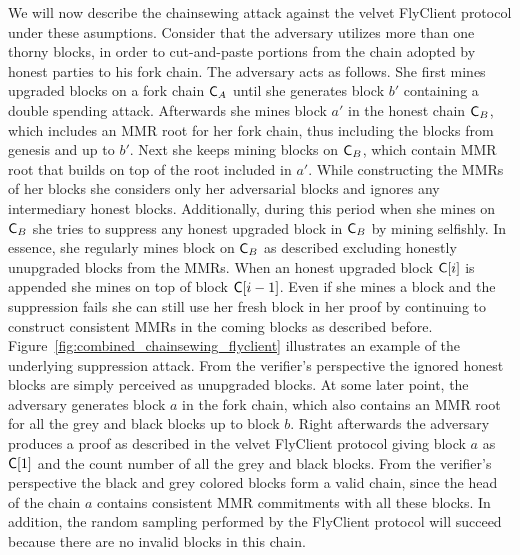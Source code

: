 	We will now describe the chainsewing attack against the velvet FlyClient protocol under these asumptions.
	Consider that the adversary utilizes more than one thorny blocks, in order to cut-and-paste portions from the chain adopted by honest parties to his fork chain. 
    The adversary acts as follows. 
    She first mines upgraded blocks on a fork chain $\mathsf{C}_A$ until she generates block $b'$ containing a double spending attack. 
    Afterwards she mines block $a'$ in the honest chain $\mathsf{C}_B$, which includes an MMR root for her fork chain, thus including the blocks from genesis and up to $b'$. 
    Next she keeps mining blocks on $\mathsf{C}_B$, which contain MMR root that builds on top of the root included in $a'$. While constructing the MMRs of her blocks she considers only her 
    adversarial blocks and ignores any intermediary honest blocks. 
    Additionally, during this period when she mines on $\mathsf{C}_B$ she tries to suppress any honest upgraded block in $\mathsf{C}_B$ by mining selfishly. 
    In essence, she regularly mines block on $\mathsf{C}_B$ as described excluding honestly unupgraded blocks from the MMRs. 
    When an honest upgraded block $\mathsf{C}[i]$ is appended she mines on top of block $\mathsf{C}[i-1]$. 
    Even if she mines a block and the suppression fails she can still use her fresh block in her proof by continuing to construct consistent MMRs 
    in the coming blocks as described before. Figure~\ref{fig:combined_chainsewing_flyclient} illustrates an example of the underlying suppression attack.
	From the verifier's perspective the ignored honest blocks are simply perceived as unupgraded blocks. At some later point, the adversary generates block $a$ 
    in the fork chain, which also contains an MMR root for all the grey and black blocks up to block $b$. 
    Right afterwards the adversary produces a proof as described in the velvet FlyClient protocol giving block $a$ as $\mathsf{C}[1]$ 
    and the count number of all the grey and black blocks. From the verifier's perspective the black and grey colored blocks form a valid chain, 
    since the head of the chain $a$ contains consistent MMR commitments with all these blocks. 
    In addition, the random sampling performed by the FlyClient protocol will succeed because there are no invalid blocks in this chain.


